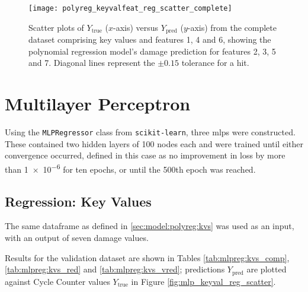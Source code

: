 \begin{figure}
    \centering
    \texttt{[image: polyreg\_keyvalfeat\_reg\_scatter\_complete]}
    \caption{\label{fig:polyreg_keyvalfeat_reg_scatter_complete} Scatter plots of \(Y_\text{true}\) (\(x\)-axis) versus \(Y_\text{pred}\) (\(y\)-axis) from the complete dataset comprising key values and features 1, 4 and 6, showing the polynomial regression model's damage prediction for features 2, 3, 5 and 7. Diagonal lines represent the \(\pm0.15\) tolerance for a hit.}
\end{figure}

\section{Multilayer Perceptron}
Using the \texttt{MLPRegressor} class from \texttt{scikit-learn}, three \ac{mlp}s were constructed. These contained two hidden layers of 100 nodes each and were trained until either convergence occurred, defined in this case as no improvement in loss by more than \num{1e-6} for ten epochs, or until the 500th epoch was reached.

\subsection{Regression: Key Values} \label{sec:model:mlp_kvs}
The same dataframe as defined in \ref{sec:model:polyreg:kvs} was used as an input, with an output of seven damage values.

Results for the validation dataset are shown in Tables \ref{tab:mlpreg:kvs_comp}, \ref{tab:mlpreg:kvs_red} and \ref{tab:mlpreg:kvs_vred}; predictions \(Y_{\text{pred}}\) are plotted against Cycle Counter values \(Y_{\text{true}}\) in Figure \ref{fig:mlp_keyval_reg_scatter}.

